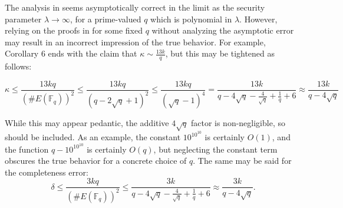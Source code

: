 \documentclass{article}
\theoremstyle{definition}
\newcommand{\Fq}{\mathbb{F}_q}
\newcommand{\6}{\mathbf}
\newcommand{\7}{\mathcal}
\begin{document}
    The analysis in \cite{BassaSoundnessIPDL} seems asymptotically correct in the limit as the security parameter $\lambda \to \infty$, for a prime-valued $q$ which is polynomial in $\lambda$. However, relying on the proofs in \cite{BassaSoundnessIPDL} for some fixed $q$ without analyzing the asymptotic error may result in an incorrect impression of the true behavior. 
    For example, Corollary 6 ends with the claim that $\kappa \sim \frac{13k}{q}$, but this may be tightened as follows:
    
    

    $$\kappa \leq \frac{13kq}{(\#E(\Fq))^2} \leq \frac{13kq}{(q-2\sqrt{q}+1)^2} \leq \frac{13kq}{(\sqrt{q}-1)^4} = \frac{13k}{q - 4\sqrt{q} - \frac{4}{\sqrt{q}} + \frac{1}{q} + 6} \approx \frac{13k}{q - 4\sqrt{q}}$$
    
    While this may appear pedantic, the additive $4\sqrt{q}$ factor is non-negligible, so should be included. As an example, the constant $10^{10^{10}}$ is certainly $O(1)$, and the function $q - 10^{10^{10}}$ is certainly $O(q)$, but neglecting the constant term obscures the true behavior for a concrete choice of $q$.  The same may be said for the completeness error:
    $$\delta \leq \frac{3kq}{(\#E(\Fq))^2} \leq \frac{3k}{q - 4\sqrt{q} - \frac{4}{\sqrt{q}} + \frac{1}{q} + 6} \approx \frac{3k}{q - 4\sqrt{q}}.$$


\end{document}
